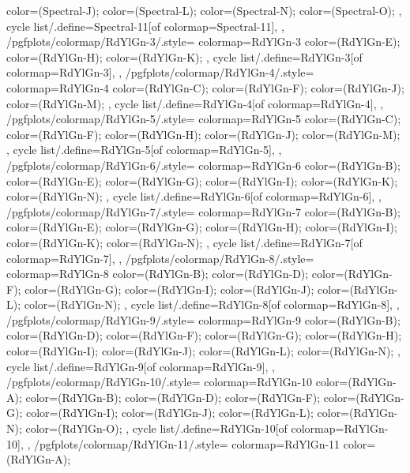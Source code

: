 {{{      color=(Spectral-J);
      color=(Spectral-L);
      color=(Spectral-N);
      color=(Spectral-O);
    },
    cycle list/.define={Spectral-11}{[of colormap=Spectral-11]},
  },
  /pgfplots/colormap/RdYlGn-3/.style={
    colormap={RdYlGn-3}{
      color=(RdYlGn-E);
      color=(RdYlGn-H);
      color=(RdYlGn-K);
    },
    cycle list/.define={RdYlGn-3}{[of colormap=RdYlGn-3]},
  },
  /pgfplots/colormap/RdYlGn-4/.style={
    colormap={RdYlGn-4}{
      color=(RdYlGn-C);
      color=(RdYlGn-F);
      color=(RdYlGn-J);
      color=(RdYlGn-M);
    },
    cycle list/.define={RdYlGn-4}{[of colormap=RdYlGn-4]},
  },
  /pgfplots/colormap/RdYlGn-5/.style={
    colormap={RdYlGn-5}{
      color=(RdYlGn-C);
      color=(RdYlGn-F);
      color=(RdYlGn-H);
      color=(RdYlGn-J);
      color=(RdYlGn-M);
    },
    cycle list/.define={RdYlGn-5}{[of colormap=RdYlGn-5]},
  },
  /pgfplots/colormap/RdYlGn-6/.style={
    colormap={RdYlGn-6}{
      color=(RdYlGn-B);
      color=(RdYlGn-E);
      color=(RdYlGn-G);
      color=(RdYlGn-I);
      color=(RdYlGn-K);
      color=(RdYlGn-N);
    },
    cycle list/.define={RdYlGn-6}{[of colormap=RdYlGn-6]},
  },
  /pgfplots/colormap/RdYlGn-7/.style={
    colormap={RdYlGn-7}{
      color=(RdYlGn-B);
      color=(RdYlGn-E);
      color=(RdYlGn-G);
      color=(RdYlGn-H);
      color=(RdYlGn-I);
      color=(RdYlGn-K);
      color=(RdYlGn-N);
    },
    cycle list/.define={RdYlGn-7}{[of colormap=RdYlGn-7]},
  },
  /pgfplots/colormap/RdYlGn-8/.style={
    colormap={RdYlGn-8}{
      color=(RdYlGn-B);
      color=(RdYlGn-D);
      color=(RdYlGn-F);
      color=(RdYlGn-G);
      color=(RdYlGn-I);
      color=(RdYlGn-J);
      color=(RdYlGn-L);
      color=(RdYlGn-N);
    },
    cycle list/.define={RdYlGn-8}{[of colormap=RdYlGn-8]},
  },
  /pgfplots/colormap/RdYlGn-9/.style={
    colormap={RdYlGn-9}{
      color=(RdYlGn-B);
      color=(RdYlGn-D);
      color=(RdYlGn-F);
      color=(RdYlGn-G);
      color=(RdYlGn-H);
      color=(RdYlGn-I);
      color=(RdYlGn-J);
      color=(RdYlGn-L);
      color=(RdYlGn-N);
    },
    cycle list/.define={RdYlGn-9}{[of colormap=RdYlGn-9]},
  },
  /pgfplots/colormap/RdYlGn-10/.style={
    colormap={RdYlGn-10}{
      color=(RdYlGn-A);
      color=(RdYlGn-B);
      color=(RdYlGn-D);
      color=(RdYlGn-F);
      color=(RdYlGn-G);
      color=(RdYlGn-I);
      color=(RdYlGn-J);
      color=(RdYlGn-L);
      color=(RdYlGn-N);
      color=(RdYlGn-O);
    },
    cycle list/.define={RdYlGn-10}{[of colormap=RdYlGn-10]},
  },
  /pgfplots/colormap/RdYlGn-11/.style={
    colormap={RdYlGn-11}{
      color=(RdYlGn-A);
}}}
